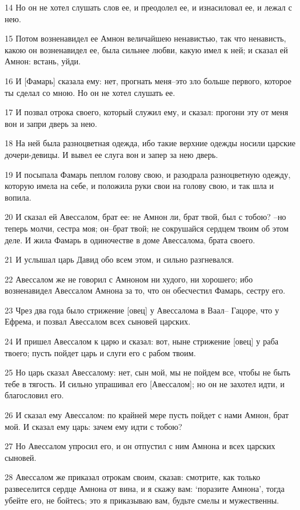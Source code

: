 \par 14 Но он не хотел слушать слов ее, и преодолел ее, и изнасиловал ее, и лежал с нею.
\par 15 Потом возненавидел ее Амнон величайшею ненавистью, так что ненависть, какою он возненавидел ее, была сильнее любви, какую имел к ней; и сказал ей Амнон: встань, уйди.
\par 16 И [Фамарь] сказала ему: нет, прогнать меня--это зло больше первого, которое ты сделал со мною. Но он не хотел слушать ее.
\par 17 И позвал отрока своего, который служил ему, и сказал: прогони эту от меня вон и запри дверь за нею.
\par 18 На ней была разноцветная одежда, ибо такие верхние одежды носили царские дочери-девицы. И вывел ее слуга вон и запер за нею дверь.
\par 19 И посыпала Фамарь пеплом голову свою, и разодрала разноцветную одежду, которую имела на себе, и положила руки свои на голову свою, и так шла и вопила.
\par 20 И сказал ей Авессалом, брат ее: не Амнон ли, брат твой, был с тобою? --но теперь молчи, сестра моя; он--брат твой; не сокрушайся сердцем твоим об этом деле. И жила Фамарь в одиночестве в доме Авессалома, брата своего.
\par 21 И услышал царь Давид обо всем этом, и сильно разгневался.
\par 22 Авессалом же не говорил с Амноном ни худого, ни хорошего; ибо возненавидел Авессалом Амнона за то, что он обесчестил Фамарь, сестру его.
\par 23 Чрез два года было стрижение [овец] у Авессалома в Ваал-- Гацоре, что у Ефрема, и позвал Авессалом всех сыновей царских.
\par 24 И пришел Авессалом к царю и сказал: вот, ныне стрижение [овец] у раба твоего; пусть пойдет царь и слуги его с рабом твоим.
\par 25 Но царь сказал Авессалому: нет, сын мой, мы не пойдем все, чтобы не быть тебе в тягость. И сильно упрашивал его [Авессалом]; но он не захотел идти, и благословил его.
\par 26 И сказал ему Авессалом: по крайней мере пусть пойдет с нами Амнон, брат мой. И сказал ему царь: зачем ему идти с тобою?
\par 27 Но Авессалом упросил его, и он отпустил с ним Амнона и всех царских сыновей.
\par 28 Авессалом же приказал отрокам своим, сказав: смотрите, как только развеселится сердце Амнона от вина, и я скажу вам: `поразите Амнона', тогда убейте его, не бойтесь; это я приказываю вам, будьте смелы и мужественны.
